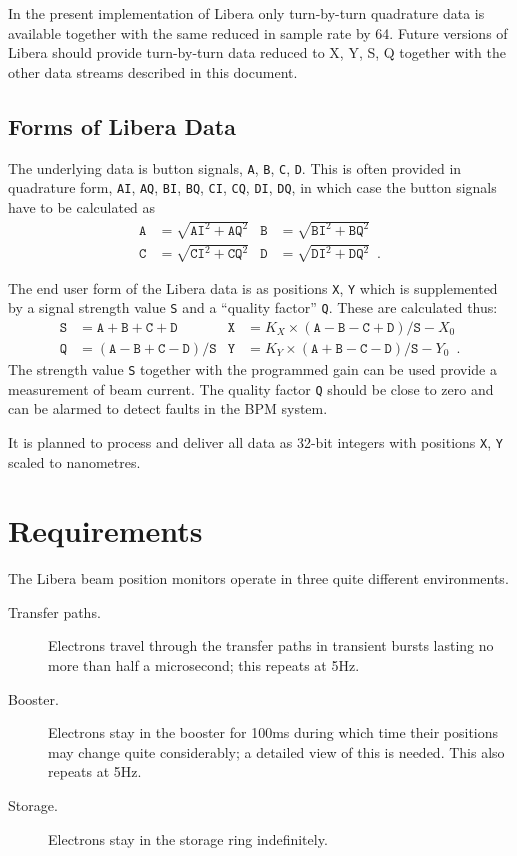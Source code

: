 \documentclass[
    a4paper,
    fleqn
]{article}
\newcommand{\id}[1]{\texttt{#1}}
\newcommand{\XY}{\id{X}, \id{Y}}
\newcommand{\ABCD}{\id{A}, \id{B}, \id{C}, \id{D}}
\newcommand{\ABCDIQ}{%
  \id{AI}, \id{AQ}, \id{BI}, \id{BQ}, 
  \id{CI}, \id{CQ}, \id{DI}, \id{DQ}}
\begin{document}
In the present implementation of Libera only turn-by-turn quadrature
data is available together with the same reduced in sample rate by 64.
Future versions of Libera should provide turn-by-turn data reduced to
X, Y, S, Q together with the other data streams described in this
document.

\subsection{Forms of Libera Data}

The underlying data is button signals, \ABCD.  This is often provided
in quadrature form, \ABCDIQ, in which case the button signals have to
be calculated as
\begin{align*}
\id{A} &= \sqrt{\id{AI}^2+\id{AQ}^2} &
\id{B} &= \sqrt{\id{BI}^2+\id{BQ}^2} \\
\id{C} &= \sqrt{\id{CI}^2+\id{CQ}^2} &
\id{D} &= \sqrt{\id{DI}^2+\id{DQ}^2} 
\enspace.
\end{align*}

The end user form of the Libera data is as positions \XY{} which is
supplemented by a signal strength value \id{S} and a ``quality
factor'' \id{Q}.  These are calculated thus:
\begin{align*}
\id{S} &= \id{A} + \id{B} + \id{C} + \id{D}  &
\id{X} &= 
    K_X \times (\id{A} - \id{B} - \id{C} + \id{D}) / \id{S} - X_0 \\
\id{Q} &= (\id{A} - \id{B} + \id{C} - \id{D}) / \id{S} &
\id{Y} &= 
    K_Y \times (\id{A} + \id{B} - \id{C} - \id{D}) / \id{S} - Y_0
\enspace.
\end{align*}
The strength value \id{S} together with the programmed gain can be
used provide a measurement of beam current.  The quality factor \id{Q}
should be close to zero and can be alarmed to detect faults in the BPM
system.

It is planned to process and deliver all data as 32-bit integers with
positions \XY{} scaled to nanometres.


\section{Requirements}

The Libera beam position monitors operate in three quite different
environments.
\begin{description}
\item[Transfer paths.]  Electrons travel through the transfer paths in
  transient bursts lasting no more than half a microsecond; this
  repeats at 5Hz.
\item[Booster.]  Electrons stay in the booster for 100ms during which
  time their positions may change quite considerably;  a detailed view
  of this is needed.  This also repeats at 5Hz.
\item[Storage.]  Electrons stay in the storage ring indefinitely.
\end{description}
\end{document}
